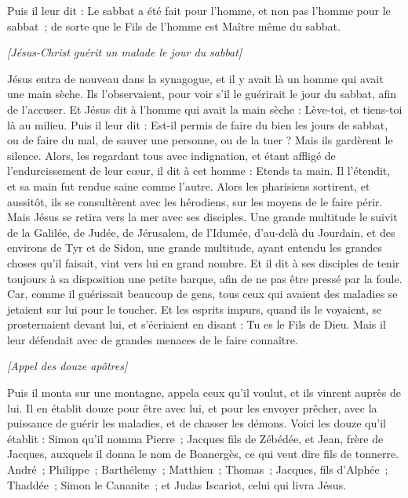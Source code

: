 \begin{multicols}{2}
Puis il leur dit : Le sabbat a été fait pour l'homme, et non pas l'homme pour le sabbat ;
de sorte que le Fils de l'homme est Maître même du sabbat.
\begin{center}
\textit{[Jésus-Christ guérit un malade le jour du sabbat]}
\end{center}
\VerseOne{}Jésus entra de nouveau dans la synagogue, et il y avait là un homme qui avait une main sèche.
Ils l'observaient, pour voir s'il le guérirait le jour du sabbat, afin de l'accuser.
Et Jésus dit à l'homme qui avait la main sèche : Lève-toi, et tiens-toi là au milieu.
Puis il leur dit : Est-il permis de faire du bien les jours de sabbat, ou de faire du mal, de sauver une personne, ou de la tuer ? Mais ils gardèrent le silence.
Alors, les regardant tous avec indignation, et étant affligé de l'endurcissement de leur cœur, il dit à cet homme : Etends ta main. Il l'étendit, et sa main fut rendue saine comme l'autre.
Alors les pharisiens sortirent, et aussitôt, ils se consultèrent avec les hérodiens, sur les moyens de le faire périr.
Mais Jésus se retira vers la mer avec ses disciples. Une grande multitude le suivit de la Galilée,
de Judée, de Jérusalem, de l’Idumée, d’au-delà du Jourdain, et des environs de Tyr et de Sidon, une grande multitude, ayant entendu les grandes choses qu'il faisait, vint vers lui en grand nombre.
Et il dit à ses disciples de tenir toujours à sa disposition une petite barque, afin de ne pas être pressé par la foule.
Car, comme il guérissait beaucoup de gens, tous ceux qui avaient des maladies se jetaient sur lui pour le toucher.
Et les esprits impurs, quand ils le voyaient, se prosternaient devant lui, et s'écriaient en disant : Tu es le Fils de Dieu.
Mais il leur défendait avec de grandes menaces de le faire connaître.
\begin{center}
\textit{[Appel des douze apôtres]}
\end{center}
\PPE{}
Puis il monta sur une montagne, appela ceux qu'il voulut, et ils vinrent auprès de lui.
Il en établit douze pour être avec lui,
et pour les envoyer prêcher, avec la puissance de guérir les maladies, et de chasser les démons.
Voici les douze qu’il établit : Simon qu'il nomma Pierre ;
Jacques fils de Zébédée, et Jean, frère de Jacques, auxquels il donna le nom de Boanergès, ce qui veut dire fils de tonnerre.
André ; Philippe ; Barthélemy ; Matthieu ; Thomas ; Jacques, fils d'Alphée ; Thaddée ; Simon le Cananite ;
et Judas Iscariot, celui qui livra Jésus.

\end{multicols}
